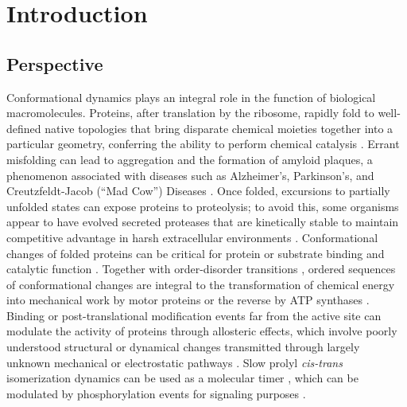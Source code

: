 \chapter{Introduction}
\label{chapter:introduction}

\section*{Perspective}


Conformational dynamics plays an integral role in the function of biological macromolecules.
Proteins, after translation by the ribosome, rapidly fold to well-defined native topologies that bring disparate chemical moieties together into a particular geometry, conferring the ability to perform chemical catalysis \cite{stryer:biochemistry}.
Errant misfolding can lead to aggregation and the formation of amyloid plaques, a phenomenon associated with diseases such as Alzheimer's, Parkinson's, and Creutzfeldt-Jacob (``Mad Cow'') Diseases \cite{dobson:nature:2003:misfolding}.
Once folded, excursions to partially unfolded states can expose proteins to proteolysis; to avoid this, some organisms appear to have evolved secreted proteases that are kinetically stable to maintain competitive advantage in harsh extracellular environments \cite{jaswal:jmb:2005:alpha-lytic}.
Conformational changes of folded proteins can be critical for protein \cite{hirose:molcell:2006} or substrate binding \cite{vandenhemel:jbc:2006} and catalytic function \cite{kern:science:2002,youngblood:jbc:2006a,boehr:2006a}.
Together with order-disorder transitions \cite{dyson:nat-rev-mol-cell-biol:2005}, ordered sequences of conformational changes are integral to the transformation of chemical energy into mechanical work by motor proteins \cite{kambara:jbc:2006,schulten:structure:2006} or the reverse by ATP synthases \cite{noji:nature:1997}.
Binding or post-translational modification events far from the active site can modulate the activity of proteins through allosteric effects, which involve poorly understood structural or dynamical changes transmitted through largely unknown mechanical or electrostatic pathways \cite{frauenfelder:pnas:2001,changeux:2005a,maki:jbc:2006a}.
Slow prolyl \emph{cis-trans} isomerization dynamics can be used as a molecular timer \cite{eckert:nsmb:2005:prolyl-isomerization-molecular-timer}, which can be modulated by phosphorylation events for signaling purposes \cite{wulf:ncb:2005:phosphorylation-specific-prolyl-isomerization}.
